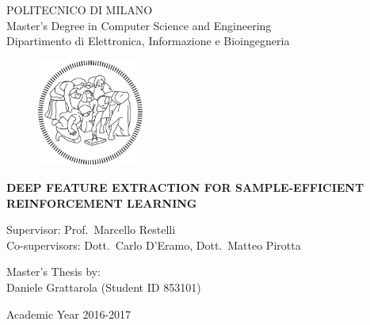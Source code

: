 \thispagestyle{empty}
\vspace*{-1.5cm} \bfseries{
    \begin{center}
	\large
	POLITECNICO DI MILANO                                                 \\
	\normalsize
	Master's Degree in Computer Science and Engineering                   \\
	Dipartimento di Elettronica, Informazione e Bioingegneria             \\  
	\vspace{0.9cm}
	\begin{figure}[htbp]
	    \begin{center}
	    \includegraphics[width=3.5cm]{pictures/logopm_cover}
	    \end{center}
	\end{figure}
	\vspace*{0.3cm} \LARGE
	\textbf{DEEP FEATURE EXTRACTION FOR SAMPLE-EFFICIENT REINFORCEMENT LEARNING}\\
	\vspace*{.75truecm} \large
    \end{center}

    \vspace*{3.0cm} \large
    
    \begin{flushleft}
	Supervisor: Prof.\ Marcello Restelli                                  \\
	Co-supervisors: Dott.\ Carlo D'Eramo, Dott.\ Matteo Pirotta
    \end{flushleft}
    
    \vspace*{1.0cm}

    \begin{flushright}
	Master's Thesis by:                                                   \\ 
	Daniele Grattarola (Student ID 853101)
    \end{flushright}
    
    \vspace*{0.5cm}

    \begin{center}
	Academic Year 2016-2017
    \end{center} \clearpage
}
